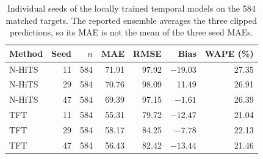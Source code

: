 \begin{table}[!htbp]\centering\small
\caption{Individual seeds of the locally trained temporal models on the 584 matched targets. The reported ensemble averages the three clipped predictions, so its MAE is not the mean of the three seed MAEs.}\label{tab:s_seeds}
\begin{tabular}{@{}lrrrrrr@{}}\toprule
Method & Seed & $n$ & MAE & RMSE & Bias & WAPE (\%) \\\midrule
N-HiTS & 11 & 584 & 71.91 & 97.92 & $-19.03$ & 27.35 \\
N-HiTS & 29 & 584 & 70.76 & 98.09 & 11.49 & 26.91 \\
N-HiTS & 47 & 584 & 69.39 & 97.15 & $-1.61$ & 26.39 \\
TFT & 11 & 584 & 55.31 & 79.72 & $-12.47$ & 21.04 \\
TFT & 29 & 584 & 58.17 & 84.25 & $-7.78$ & 22.13 \\
TFT & 47 & 584 & 56.43 & 82.42 & $-13.44$ & 21.46 \\
\bottomrule
\end{tabular}
\end{table}
